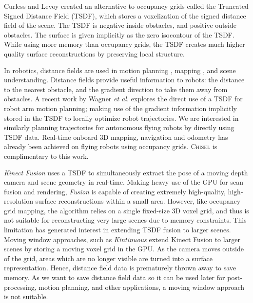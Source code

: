 \documentclass[conference]{IEEEtran}
\newcommand{\etal}{\textit{et al.}\xspace}
\newcommand{\TSDF}{TSDF\xspace}
\newcommand{\chisel}{\textsc{Chisel}\xspace}
\begin{document}

Curless and Levoy \cite{Curless1996} created an alternative to occupancy
grids called the Truncated Signed Distance Field (\TSDF), which stores a
voxelization of the signed distance field of the scene. The \TSDF is negative
inside obstacles, and positive outside obstacles. The surface is given
implicitly as the zero isocontour of the \TSDF. While using more memory
than occupancy grids, the \TSDF creates much higher quality surface
reconstructions by preserving local structure.

In robotics, distance fields are used in motion planning
\cite{RatliffChomp}, mapping \cite{VandapelKA05}, and scene understanding.
Distance fields provide useful information to robots: the distance to the
nearest obstacle, and the gradient direction to take them away from obstacles. 
A recent work by Wagner \etal \cite{WagnerICRA13} explores the direct use of a
\TSDF for robot arm motion planning; making use of the gradient information
implicitly stored in the \TSDF to locally optimize robot trajectories. We are
interested in similarly planning trajectories for autonomous flying robots by
directly using \TSDF data. Real-time onboard 3D mapping,
navigation and odometry has already been achieved on flying robots
\cite{FlyingNavigation, OSMAV}using occupancy grids. \chisel is
complimentary to this work.

\emph{Kinect Fusion} \cite{Newcombe} uses a \TSDF to simultaneously extract the
pose of a moving depth camera and scene geometry in real-time. Making
heavy use of the GPU for scan fusion and rendering, \textit{Fusion} is capable
of creating extremely high-quality, high-resolution surface reconstructions within
a small area. However, like occupancy grid mapping, the algorithm relies on a
single fixed-size 3D voxel grid, and thus is not suitable for reconstructing
very large scenes due to memory constraints. This limitation has generated
interest in extending  \TSDF fusion to larger scenes. 
Moving window approaches, such as \emph{Kintinuous} \cite{Whelan2013} extend
Kinect Fusion to larger scenes by storing  a moving voxel grid in the GPU. As
the camera moves outside of the grid, areas which are no longer visible are
turned into a surface representation. Hence, distance field data is prematurely 
thrown away to save memory. As we want to save distance field data so it can be
used later for post-processing, motion planning, and other applications, a
moving window approach is not suitable.
\end{document}
